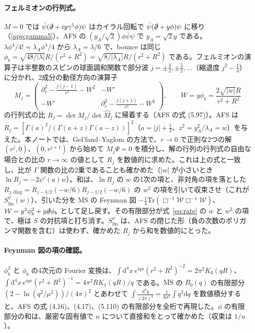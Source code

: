 \documentclass[a4paper,10pt]{ltjsarticle}
\newcommand{\dd}{\mathrm{d}}
\newcommand{\MSbar}{\overline{\mathrm{MS}}}
\begin{document}
\paragraph{フェルミオンの行列式。}$M=0$ では $\bar\psi(\slashed\partial+iy\gamma^5\phi)\psi$ はカイラル回転で $\bar\psi(\slashed\partial+y\phi)\psi$ に移り（\ref{app:gamma5}）、AFS の $(y_A/\sqrt2)\phi\bar\psi\psi$ で $y_A=\sqrt2y$ である。$\lambda\phi^4/4!=\lambda_A\phi^4/4$ から $\lambda_A=\lambda/6$ で、bounce は同じ $\phi_b=\sqrt{48/|\lambda|}R/(r^2+R^2)=\sqrt{8/|\lambda_A|}R/(r^2+R^2)$ である。フェルミオンの演算子は半整数のスピンの球面調和関数で部分波 $j=\pm\frac32,\pm\frac52,\dots$（縮退度 $j^2-\frac14$）に分かれ、2成分の動径方向の演算子
\begin{equation*}
M_j=\begin{pmatrix}\partial_r^2-\frac{j(j-1)}{r^2}-W^2&-W'\\-W'&\partial_r^2-\frac{j(j+1)}{r^2}-W^2\end{pmatrix},\qquad W=y\phi_b=\frac{2\sqrt{|w|}R}{r^2+R^2}
\end{equation*}
の行列式の比 $R_j=\det M_j/\det\hat M_j$ に帰着する（AFS の式 (5.97)）。AFS は $R_j=[\Gamma(a)^2/(\Gamma(a+z)\Gamma(a-z))]^2$（$a=|j|+\frac12$、$z^2=y_A^2/\lambda_A=w$）を与えた。本ノートでは、Gel'fand--Yaglom の方法で、$r\to0$ で正則な2つの解 $(r^j,0)$、$(0,r^{j+1})$ から始めて $M_j\Psi=0$ を積分し、解の行列の行列式の自由な場合との比の $r\to\infty$ の値として $R_j$ を数値的に求めた。これは上の式と一致し、比が $\Gamma$ 関数の比の2乗であることも確かめた（$|w|$ が小さいとき $\ln R_j=-2\psi'(a)w$）。和は、$\ln R_j$ の $w$ の1次の項と、非対角の項を落とした $R_{j,\mathrm{diag}}=R_{j-3/2}(-w/6)R_{j-1/2}(-w/6)$ の $w^2$ の項を引いて収束させ（これが $S^\psi_{\mathrm{fin}}(w)$）、引いた分を $\MSbar$ の Feynman 図 $-\frac14\mathrm{Tr}(\Box^{-1}\mathcal W\Box^{-1}\mathcal W)$、$\mathcal W=y^2\phi_b^2+y\slashed\partial\phi_b$ として足し戻す。その有限部分が式~\eqref{eq:rate} の $w$ と $w^2$ の項で、極は $S$ の対抗項と打ち消す。$S^\psi_{\mathrm{fin}}$ は、AFS の閉じた形（負の次数のポリガンマ関数を含む）は使わず、確かめた $R_j$ から和を数値的にとった。

\paragraph{Feynman 図の項の確認。}$\phi_b^2$ と $\phi_b$ の4次元の Fourier 変換は、$\int\dd^4x\,e^{iqx}(r^2+R^2)^{-2}=2\pi^2K_0(qR)$、$\int\dd^4x\,e^{iqx}(r^2+R^2)^{-1}=4\pi^2RK_1(qR)/q$ である。$\MSbar$ の $B_0(q)$ の有限部分 $(2-\ln(q^2/\mu^2))/(4\pi)^2$ とあわせて $\int\frac{\dd^4q}{(2\pi)^4}=\frac{1}{8\pi^2}\int q^3\dd q$ を数値積分すると、AFS の式 (4.16)、(4.17)、(5.110) の有限部分を全桁で再現した。$\phi$ の有限部分の和は、厳密な固有値で $n$ について直接和をとって確かめた（収束は $1/n$）。
\end{document}
